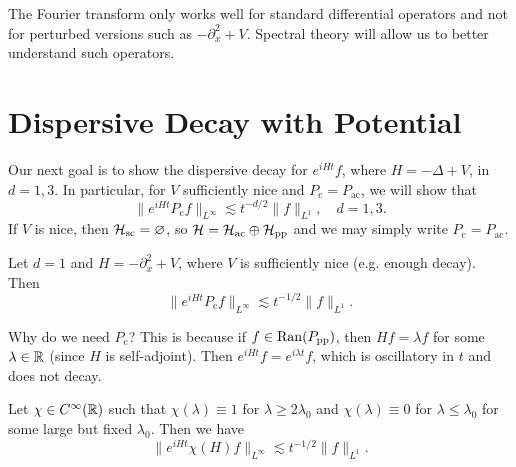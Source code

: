 \begin{remark}
  The Fourier transform only works well for
  standard differential operators and not for
  perturbed versions such as $-\partial_x^2 + V$.
  Spectral theory will allow us to
  better understand such operators.
\end{remark}

\section{Dispersive Decay with Potential}

\begin{remark}
  Our next goal is to show the dispersive decay
  for $e^{iH t} f$, where $H = -\Delta + V$, in
  $d = 1, 3$. In particular, for $V$ sufficiently
  nice and $P_{\mathrm{c}} = P_{\mathrm{ac}}$, we will show that
  \[
    \| e^{iHt} P_{\mathrm{c}} f \|_{L^\infty} \lesssim t^{-d / 2} \|f\|_{L^1}, \quad d = 1, 3.
  \]
  If $V$ is nice, then $\mathcal{H}_{\mathrm{sc}} = \varnothing$, so
  $\mathcal{H} = \mathcal{H}_{\mathrm{ac}} \oplus \mathcal{H}_{\mathrm{pp}}$ and we may simply write
  $P_{\mathrm{c}} = P_{\mathrm{ac}}$.
\end{remark}

\begin{theorem}\label{thm:dispersive-decay-1d}
  Let $d = 1$ and $H = -\partial_x^2 + V$, where
  $V$ is sufficiently nice (e.g. enough decay).
  Then
  \[
    \|e^{iHt} P_{\mathrm{c}} f\|_{L^\infty} \lesssim t^{-1 / 2} \|f\|_{L^1}.
  \]
\end{theorem}

\begin{remark}
  Why do we need $P_{\mathrm{c}}$? This is because
  if $f \in \operatorname{Ran}(P_{\mathrm{pp}})$, then $Hf = \lambda f$
  for some $\lambda \in \mathbb{R}$ (since $H$ is self-adjoint).
  Then $e^{iHt} f = e^{i\lambda t} f$, which is
  oscillatory in $t$ and does not decay.
\end{remark}

\begin{lemma}
  Let
  $\chi \in C^\infty(\mathbb{R})$ such that
  $\chi(\lambda) \equiv 1$ for $\lambda \ge 2 \lambda_0$
  and $\chi(\lambda) \equiv 0$ for $\lambda \le \lambda_0$
  for some large but fixed $\lambda_0$. Then we have
  \[
    \| e^{iHt} \chi(H) f \|_{L^\infty} \lesssim t^{-1 / 2} \|f\|_{L^1}.
  \]
\end{lemma}

